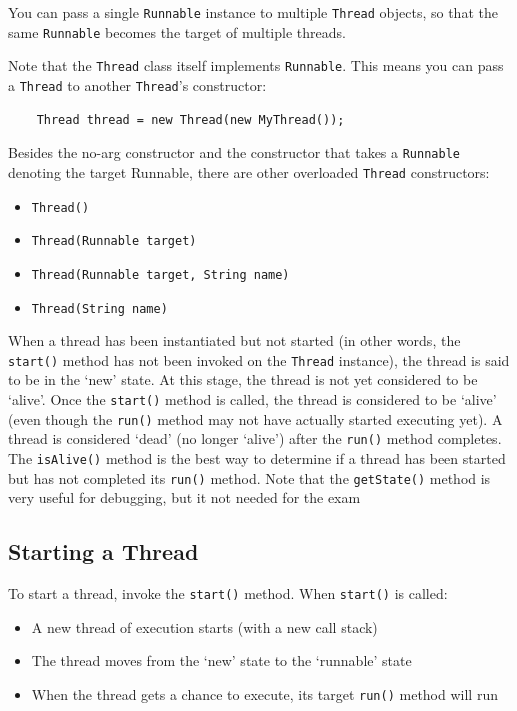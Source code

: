 You can pass a single \verb#Runnable# instance to multiple \verb#Thread# objects, so that the same \verb#Runnable# becomes the target of multiple threads.

Note that the \verb#Thread# class itself implements \verb#Runnable#. This means you can pass a \verb#Thread# to another \verb#Thread#'s constructor:
\begin{verbatim}
    Thread thread = new Thread(new MyThread());
\end{verbatim}

Besides the no-arg constructor and the constructor that takes a \verb#Runnable# denoting the target Runnable, there are other overloaded \verb#Thread# constructors:
\begin{itemize}
    \item \verb#Thread()#
    \item \verb#Thread(Runnable target)#
    \item \verb#Thread(Runnable target, String name)#
    \item \verb#Thread(String name)#
\end{itemize}
When a thread has been instantiated but not started (in other words, the \verb#start()# method has not been invoked on the \verb#Thread# instance), the thread is said to be in the `new' state. At this stage, the thread is not yet considered to be `alive'. Once the \verb#start()# method is called, the thread is considered to be `alive' (even though the \verb#run()# method may not have actually started executing yet). A thread is considered `dead' (no longer `alive') after the \verb#run()# method completes. The \verb#isAlive()# method is the best way to determine if a thread has been started but has not completed its \verb#run()# method. Note that the \verb#getState()# method is very useful for debugging, but it not needed for the exam

\subsection{Starting a Thread}
To start a thread, invoke the \verb#start()# method. When \verb#start()# is called:
\begin{itemize}
    \item A new thread of execution starts (with a new call stack)
    \item The thread moves from the `new' state to the `runnable' state
    \item When the thread gets a chance to execute, its target \verb#run()# method will run
\end{itemize}

